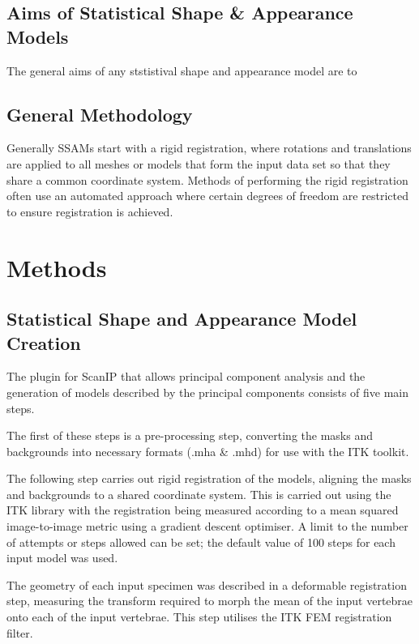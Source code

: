 \subsection{Aims of Statistical Shape \& Appearance Models}

The general aims of any ststistival shape and appearance model are to 

\subsection{General Methodology}

Generally SSAMs start with a rigid registration, where rotations and
translations are applied to all meshes or models that form the input data set
so that they share a common coordinate system.  Methods of performing the rigid
registration often use an automated approach where certain degrees of freedom
are restricted to ensure registration is achieved.



\section{Methods}


\subsection{Statistical Shape and Appearance Model Creation}

The plugin for ScanIP that allows principal component analysis and the
generation of models described by the principal components consists of five
main steps.

The first of these steps is a pre-processing step, converting the masks and
backgrounds into necessary formats (.mha \& .mhd) for use with the ITK
toolkit.

The following step carries out rigid registration of the models, aligning the
masks and backgrounds to a shared coordinate system.  This is carried out using
the ITK library with the registration being measured according to a mean
squared image-to-image metric using a gradient descent optimiser.  A limit to
the number of attempts or steps allowed can be set; the default value of 100
steps for each input model was used.

The geometry of each input specimen was described in a deformable registration
step, measuring the transform required to morph the mean of the input vertebrae
onto each of the input vertebrae.  This step utilises the ITK FEM registration
filter.

